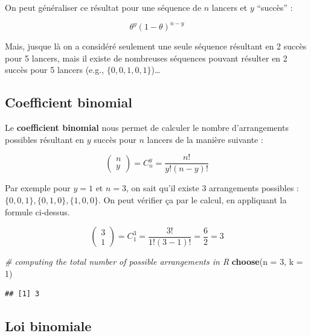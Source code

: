 \documentclass[
  a4paper,11pt,twoside,onecolumn,openright,final,oldfontcommands]{memoir}
\newenvironment{Shaded}{\begin{snugshade}}{\end{snugshade}}
\newcommand{\CommentTok}[1]{\textcolor[rgb]{0.56,0.35,0.01}{\textit{#1}}}
\newcommand{\DataTypeTok}[1]{\textcolor[rgb]{0.13,0.29,0.53}{#1}}
\newcommand{\DecValTok}[1]{\textcolor[rgb]{0.00,0.00,0.81}{#1}}
\newcommand{\KeywordTok}[1]{\textcolor[rgb]{0.13,0.29,0.53}{\textbf{#1}}}
\newcommand{\NormalTok}[1]{#1}
\theoremstyle{definition}
\theoremstyle{definition}
\theoremstyle{definition}
\theoremstyle{remark}
\begin{document}
On peut généraliser ce résultat pour une séquence de \(n\) lancers et \(y\) ``succès'' :

\[\theta^{y} (1 - \theta)^{n - y}\]

Mais, jusque là on a considéré seulement une seule séquence résultant en 2 succès pour 5 lancers, mais il existe de nombreuses séquences pouvant résulter en 2 succès pour 5 lancers (e.g., \(\{0, 0, 1, 0, 1\}\))\ldots{}

\hypertarget{coefficient-binomial-1}{%
\subsection{Coefficient binomial}\label{coefficient-binomial-1}}

Le \textbf{coefficient binomial} nous permet de calculer le nombre d'arrangements possibles résultant en \(y\) succès pour \(n\) lancers de la manière suivante :

\[
\left(\begin{array}{l} n \\ y \end{array}\right) = C_{n}^{y} = \frac{n !}{y !(n - y) !}
\]

Par exemple pour \(y = 1\) et \(n = 3\), on sait qu'il existe 3 arrangements possibles : \(\{0, 0, 1\}, \{0, 1, 0\}, \{1, 0, 0\}\). On peut vérifier ça par le calcul, en appliquant la formule ci-dessus.

\[
\left(\begin{array}{l} 3 \\ 1\end{array}\right) = C_{1}^{3} = \frac{3 !}{1 !(3 - 1) !} = \frac{6}{2} = 3
\]

\begin{Shaded}
\begin{Highlighting}[]
\CommentTok{\# computing the total number of possible arrangements in R}
\KeywordTok{choose}\NormalTok{(}\DataTypeTok{n =} \DecValTok{3}\NormalTok{, }\DataTypeTok{k =} \DecValTok{1}\NormalTok{)}
\end{Highlighting}
\end{Shaded}

\begin{verbatim}
## [1] 3
\end{verbatim}

\hypertarget{loi-binomiale}{%
\subsection{Loi binomiale}\label{loi-binomiale}}
\end{document}
